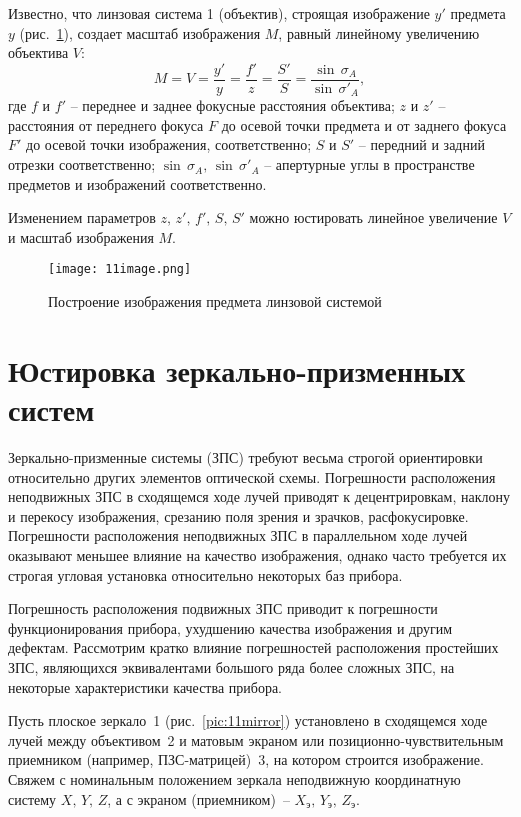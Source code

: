 Известно, что линзовая система 1 (объектив), строящая изображение $ y' $ предмета $ y $ (рис.~\ref{pic:11image}), создает масштаб изображения $ M $, равный линейному увеличению объектива $ V $:
\[ M = V = \dfrac{y'}{y} = \dfrac{f'}{z} = \dfrac{S'}{S} =\dfrac{\sin\,\sigma_A}{\sin\,\sigma'_A}, \]
где $ f $ и $ f' $ -- переднее и заднее фокусные расстояния объектива; $ z $ и $ z' $ -- расстояния от переднего фокуса $ F $ до осевой точки предмета и от заднего фокуса $ F' $ до осевой точки изображения, соответственно; $ S $ и $ S' $ -- передний и задний отрезки соответственно; $ \sin\,\sigma_A,\,\sin\,\sigma'_A $ -- апертурные углы в пространстве предметов и изображений соответственно.

Изменением параметров $ z, \, z' ,\, f',\, S,\, S' $ можно юстировать линейное увеличение $ V $ и масштаб изображения $ M $.

\begin{figure}[h!]
	\caption{ Построение изображения предмета линзовой системой }
	\texttt{[image: 11image.png]}
	\label{pic:11image}
\end{figure}


\section{Юстировка зеркально-призменных систем}

Зеркально-призменные системы (ЗПС) требуют весьма строгой ориентировки относительно других элементов оптической схемы. Погрешности расположения неподвижных ЗПС в сходящемся ходе лучей приводят к децентрировкам, наклону и перекосу изображения, срезанию поля зрения и зрачков, расфокусировке. Погрешности расположения неподвижных ЗПС в параллельном ходе лучей оказывают меньшее влияние на качество изображения, однако часто требуется их строгая угловая установка относительно некоторых баз прибора.

Погрешность расположения подвижных ЗПС приводит к погрешности функционирования прибора, ухудшению качества изображения и другим дефектам. Рассмотрим кратко влияние погрешностей расположения простейших ЗПС, являющихся эквивалентами большого ряда более сложных ЗПС, на некоторые характеристики качества прибора.

Пусть плоское зеркало~1 (рис.~\ref{pic:11mirror}) установлено в сходящемся ходе лучей между объективом~2 и матовым экраном или позиционно-чувствительным приемником (например, ПЗС-матрицей)~3, на котором строится изображение. Свяжем с номинальным положением зеркала неподвижную координатную систему $ X,\, Y,\, Z $, а с экраном (приемником)~-- $ X_\text{э},\, Y_\text{э},\, Z_\text{э} $.

